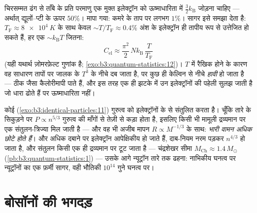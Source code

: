 \begin{example}[ऊष्माधारिता का कांड, सुलझा]\label{ex:b3:quantum-statistics:heat}
चिरसम्मत ढंग से ताँबे के प्रति परमाणु एक मुक्त इलेक्ट्रॉन को
ऊष्माधारिता में $\tfrac32
k_{\text{B}}$ जोड़ना चाहिए --- अर्थात् द्यूलों--प्टी के ऊपर $50\%$।
मापा गया: कमरे के ताप पर लगभग $1\%$। सागर इसे
समझा देता है: $T_{\text{F}} \approx \qty{8e4}{K}$ के साथ केवल
$\sim T/T_{\text{F}} \approx 0.4\%$ अंश के इलेक्ट्रॉन ही
तापीय रूप से उत्तेजित हो सकते हैं, हर एक $\sim k_{\text{B}}T$ जितना:
\[
C_{\text{el}} \approx \frac{\pi^2}{2}\,
Nk_{\text{B}}\,\frac{T}{T_{\text{F}}}
\]
(यही यथार्थ ज़ोमरफ़ेल्ट गुणांक है;
\cref{exo:b3:quantum-statistics:12})। $T$ में रैखिक होने के कारण वह
साधारण तापों पर जालक के $T^3$ के नीचे दब जाता है, पर कुछ ही केल्विन
से नीचे \emph{हावी} हो जाता है --- ठीक जैसा कैलोरीमापी पाते हैं, और
इस तरह एक ही झटके में उन इलेक्ट्रॉनों की पहेली सुलझ जाती है जो धारा
ढोते हैं पर ऊष्माधारिता नहीं।
\end{example}

\begin{example}[अपवर्जन से थमे तारे]\label{ex:b3:quantum-statistics:dwarf}
कोई  (\cref{exo:b3:identical-particles:11}) गुरुत्व को
इलेक्ट्रॉनों के  से संतुलित करता है। चूँकि तारे के
सिकुड़ने पर $P \propto
n^{5/3}$ गुरुत्व की माँगों से तेज़ी से कड़ा होता है, इसलिए किसी भी
मामूली द्रव्यमान पर एक संतुलन-त्रिज्या मिल जाती है --- और वह भी
अजीब मापन $R \propto M^{-1/3}$ के साथ: \emph{भारी वामन अधिक छोटे
होते हैं}। और अधिक दबाने पर इलेक्ट्रॉन आपेक्षिकीय हो जाते हैं,
दाब-नियम नरम पड़कर $n^{4/3}$ हो जाता है, और संतुलन किसी एक ही
द्रव्यमान पर टूट जाता है --- चंद्रशेखर सीमा $M_{\text{Ch}} \approx
1.4\,M_\odot$ (\cref{pb:b3:quantum-statistics:1}) --- उसके आगे
न्यूट्रॉन तारे तक ढहना: नाभिकीय घनत्व पर न्यूट्रॉनों का एक फ़र्मी
सागर, वही भौतिकी $10^{14}$ गुने घनत्व पर।
\end{example}

\section{बोसॉनों की भगदड़}

